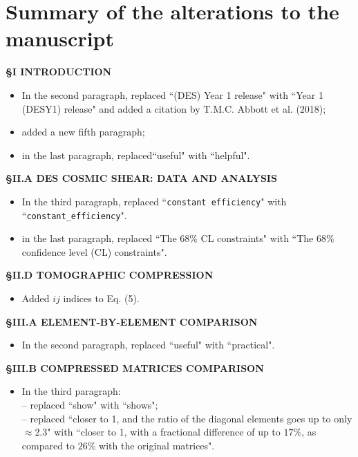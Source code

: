\documentclass[11pt]{article}
\begin{document}
	
	\section*{Summary of the alterations to the manuscript}
\vskip 0.5cm
		
\textbf{\S I \quad \small{INTRODUCTION}}
\begin{itemize}
	\item In the second paragraph, replaced ``(DES) Year 1 release" with ``Year 1 (DESY1) release" and added a citation by T.M.C. Abbott et al. (2018);
	\item added a new fifth paragraph;
	\item in the last paragraph, replaced``useful" with ``helpful".
\end{itemize}

\noindent \textbf{\S II.A \quad \small{DES COSMIC SHEAR: DATA AND ANALYSIS}}
\begin{itemize}
	\item In the third paragraph, replaced ``\texttt{constant efficiency}" with ``\texttt{constant\_efficiency}".
	\item in the last paragraph, replaced ``The 68\% CL constraints" with  ``The 68\% confidence level (CL) constraints".
\end{itemize}

\noindent \textbf{\S II.D \quad \small{TOMOGRAPHIC COMPRESSION}}
	\begin{itemize}
		\item Added $ij$ indices to Eq. (5).
	\end{itemize}

\noindent \textbf{\S III.A \quad \small{ELEMENT-BY-ELEMENT COMPARISON}}
\begin{itemize}
	\item In the second paragraph, replaced ``useful" with ``practical".
\end{itemize}

\noindent \textbf{\S III.B \quad \small{COMPRESSED MATRICES COMPARISON}}
\begin{itemize}
	\item In the third paragraph:\\
		-- replaced ``show" with ``shows";\\
		-- replaced ``closer to 1, and the ratio of the diagonal elements goes up to only $\approx 2.3$" with ``closer to 1, with a fractional difference of up to $17\%$, as compared to $26\%$ with the original matrices".
\end{itemize}
\end{document}
